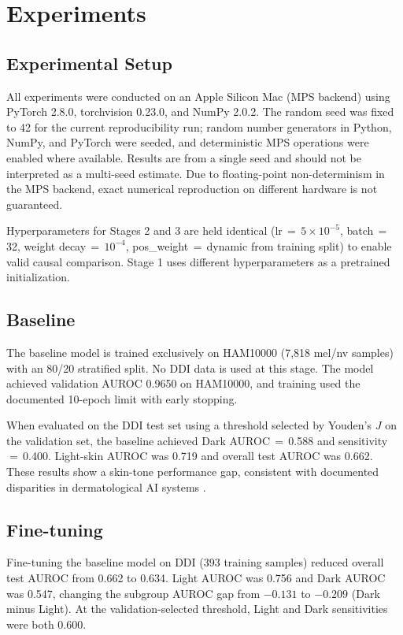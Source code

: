 \section{Experiments}

\subsection{Experimental Setup}

All experiments were conducted on an Apple Silicon Mac (MPS backend) using PyTorch 2.8.0, torchvision 0.23.0, and NumPy 2.0.2. The random seed was fixed to 42 for the current reproducibility run; random number generators in Python, NumPy, and PyTorch were seeded, and deterministic MPS operations were enabled where available. Results are from a single seed and should not be interpreted as a multi-seed estimate. Due to floating-point non-determinism in the MPS backend, exact numerical reproduction on different hardware is not guaranteed.

Hyperparameters for Stages 2 and 3 are held identical (lr\,$=$\,$5{\times}10^{-5}$, batch\,$=$\,32, weight decay\,$=$\,$10^{-4}$, pos\_weight\,$=$\,dynamic from training split) to enable valid causal comparison. Stage 1 uses different hyperparameters as a pretrained initialization.

\subsection{Baseline}

The baseline model is trained exclusively on HAM10000 (7,818 mel/nv samples) with an 80/20 stratified split. No DDI data is used at this stage. The model achieved validation AUROC 0.9650 on HAM10000, and training used the documented 10-epoch limit with early stopping.

When evaluated on the DDI test set using a threshold selected by Youden's $J$ on the validation set, the baseline achieved Dark AUROC\,$=$\,0.588 and sensitivity\,$=$\,0.400. Light-skin AUROC was 0.719 and overall test AUROC was 0.662. These results show a skin-tone performance gap, consistent with documented disparities in dermatological AI systems \cite{Daneshjou2022, Groh2021}.

\subsection{Fine-tuning}

Fine-tuning the baseline model on DDI (393 training samples) reduced overall test AUROC from 0.662 to 0.634. Light AUROC was 0.756 and Dark AUROC was 0.547, changing the subgroup AUROC gap from $-0.131$ to $-0.209$ (Dark minus Light). At the validation-selected threshold, Light and Dark sensitivities were both 0.600.

